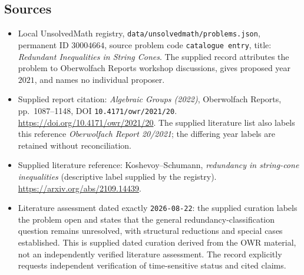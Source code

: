 \documentclass[11pt]{article}
\begin{document}
\subsection{Sources}
\begin{itemize}
\item Local UnsolvedMath registry, \texttt{data/unsolvedmath/problems.json}, permanent ID \(30004664\), source problem code \texttt{catalogue entry}, title: \emph{Redundant Inequalities in String Cones}. The supplied record attributes the problem to Oberwolfach Reports workshop discussions, gives proposed year \(2021\), and names no individual proposer.
\item Supplied report citation: \emph{Algebraic Groups (2022)}, Oberwolfach Reports, pp.\ 1087--1148, DOI \texttt{10.4171/owr/2021/20}. \url{https://doi.org/10.4171/owr/2021/20}. The supplied literature list also labels this reference \emph{Oberwolfach Report 20/2021}; the differing year labels are retained without reconciliation.
\item Supplied literature reference: Koshevoy--Schumann, \emph{redundancy in string-cone inequalities} (descriptive label supplied by the registry). \url{https://arxiv.org/abs/2109.14439}.
\item Literature assessment dated exactly \texttt{2026-08-22}: the supplied curation labels the problem open and states that the general redundancy-classification question remains unresolved, with structural reductions and special cases established. This is supplied dated curation derived from the OWR material, not an independently verified literature assessment. The record explicitly requests independent verification of time-sensitive status and cited claims.
\end{itemize}
\end{document}
